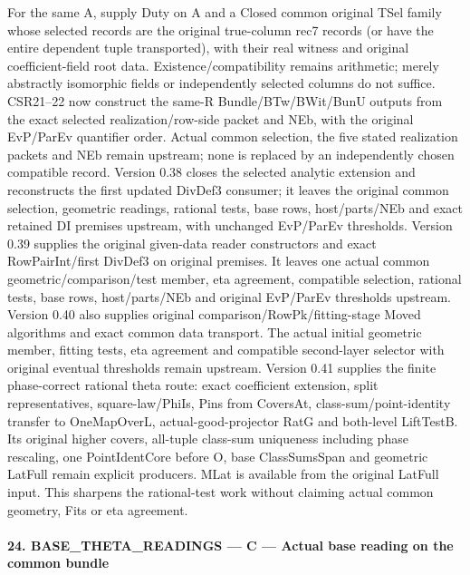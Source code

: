 \documentclass[11pt,a4paper]{article}
\numberwithin{equation}{section}
\theoremstyle{remark}\newtheorem{remark}[theorem]{Remark}
\begin{document}
For the same A, supply Duty on A and a Closed common original TSel family whose selected records are the original true-column rec7 records (or have the entire dependent tuple transported), with their real witness and original coefficient-field root data. Existence/compatibility remains arithmetic; merely abstractly isomorphic fields or independently selected columns do not suffice. CSR21–22 now construct the same-R Bundle/BTw/BWit/BunU outputs from the exact selected realization/row-side packet and NEb, with the original EvP/ParEv quantifier order. Actual common selection, the five stated realization packets and NEb remain upstream; none is replaced by an independently chosen compatible record. Version 0.38 closes the selected analytic extension and reconstructs the first updated DivDef3 consumer; it leaves the original common selection, geometric readings, rational tests, base rows, host/parts/NEb and exact retained DI premises upstream, with unchanged EvP/ParEv thresholds. Version 0.39 supplies the original given-data reader constructors and exact RowPairInt/first DivDef3 on original premises. It leaves one actual common geometric/comparison/test member, eta agreement, compatible selection, rational tests, base rows, host/parts/NEb and original EvP/ParEv thresholds upstream. Version 0.40 also supplies original comparison/RowPk/fitting-stage Moved algorithms and exact common data transport. The actual initial geometric member, fitting tests, eta agreement and compatible second-layer selector with original eventual thresholds remain upstream. Version 0.41 supplies the finite phase-correct rational theta route: exact coefficient extension, split representatives, square-law/PhiIs, Pins from CoversAt, class-sum/point-identity transfer to OneMapOverL, actual-good-projector RatG and both-level LiftTestB. Its original higher covers, all-tuple class-sum uniqueness including phase rescaling, one PointIdentCore before O, base ClassSumsSpan and geometric LatFull remain explicit producers. MLat is available from the original LatFull input. This sharpens the rational-test work without claiming actual common geometry, Fits or eta agreement.



\paragraph{24. BASE\_\allowbreak THETA\_\allowbreak READINGS — C — Actual base reading on the common bundle}
\end{document}
